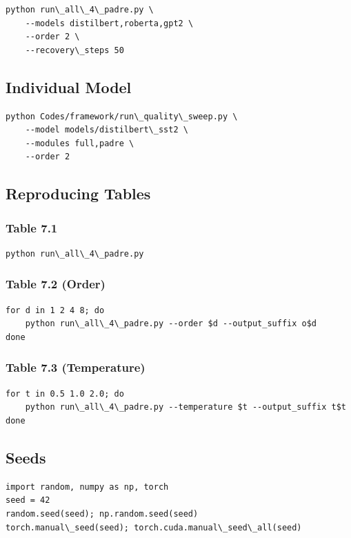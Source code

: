 \begin{lstlisting}
python run\_all\_4\_padre.py \
    --models distilbert,roberta,gpt2 \
    --order 2 \
    --recovery\_steps 50
\end{lstlisting}

\subsection{Individual Model}

\begin{lstlisting}
python Codes/framework/run\_quality\_sweep.py \
    --model models/distilbert\_sst2 \
    --modules full,padre \
    --order 2
\end{lstlisting}

\subsection{Reproducing Tables}

\subsubsection{Table 7.1}
\begin{lstlisting}
python run\_all\_4\_padre.py
\end{lstlisting}

\subsubsection{Table 7.2 (Order)}
\begin{lstlisting}
for d in 1 2 4 8; do
    python run\_all\_4\_padre.py --order $d --output_suffix o$d
done
\end{lstlisting}

\subsubsection{Table 7.3 (Temperature)}
\begin{lstlisting}
for t in 0.5 1.0 2.0; do
    python run\_all\_4\_padre.py --temperature $t --output_suffix t$t
done
\end{lstlisting}

\subsection{Seeds}

\begin{lstlisting}
import random, numpy as np, torch
seed = 42
random.seed(seed); np.random.seed(seed)
torch.manual\_seed(seed); torch.cuda.manual\_seed\_all(seed)
\end{lstlisting}

